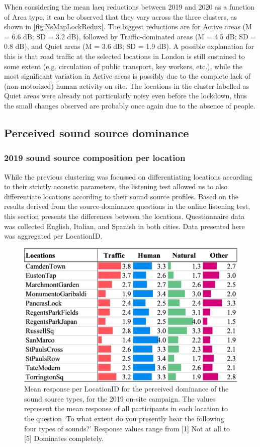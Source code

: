 When considering the mean \gls{laeq} reductions between 2019 and 2020 as a function of Area type, it can be observed that they vary across the three clusters, as shown in \cref{fig:NsMapLockRedux}. The biggest reductions are for Active areas (M = 6.6 dB; SD = 3.2 dB), followed by Traffic-dominated areas (M = 4.5 dB; SD = 0.8 dB), and Quiet areas (M = 3.6 dB; SD = 1.9 dB). A possible explanation for this is that road traffic at the selected locations in London is still sustained to some extent (e.g. circulation of public transport, key workers, etc.), while the most significant variation in Active areas is possibly due to the complete lack of (non-motorized) human activity on site. The locations in the cluster labelled as Quiet areas were already not particularly noisy even before the lockdown, thus the small changes observed are probably once again due to the absence of people.


 \subsection{Perceived sound source dominance}

   \subsubsection{2019 sound source composition per location}
  While the previous clustering was focussed on differentiating locations according to their strictly acoustic parameters, the listening test allowed us to also differentiate locations according to their sound source profiles. Based on the results derived from the source-dominance questions in the online listening test, this section presents the differences between the locations. Questionnaire data was collected English, Italian, and Spanish in both cities. Data presented here was aggregated per LocationID.


   \begin{figure}[h]
     \centering
     \includegraphics[width=.75\textwidth]{Figures/Lockdown-Fig2.jpg}
     \caption{Mean response per LocationID for the perceived dominance of the sound source types, for the 2019 on-site campaign. The values represent the mean response of all participants in each location to the question `To what extent do you presently hear the following four types of sounds?' Response values range from [1] Not at all to [5] Dominates completely. \label{fig:sound-source-dom}}
   \end{figure}

